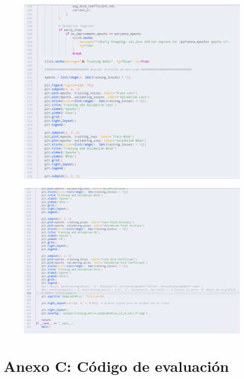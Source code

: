 \begin{figure}[h!]
	\centering
	\includegraphics[width=0.9\linewidth]{graficos/entrenamiento8}
\end{figure}

\begin{figure}[h!]
	\centering
	\includegraphics[width=0.9\linewidth]{graficos/entrenamiento9}
\end{figure}

\newpage
\clearpage %
\section*{Anexo C: Código de evaluación}

